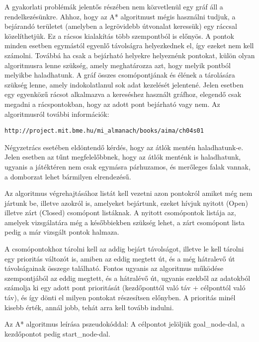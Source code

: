 A gyakorlati problémák jelentős részében nem közvetlenül egy gráf áll a rendelkezésünkre. Ahhoz, hogy az A* algoritmust mégis használni tudjuk, a bejárandó területet (amelyben a legrövidebb útvonalat keressük) egy ráccsal közelíthetjük. Ez a rácsos kialakítás több szempontból is előnyös. A pontok minden esetben egymástól egyenlő távolságra helyezkednek el, így ezeket nem kell számolni. Továbbá ha csak a bejárható helyekre helyeznénk pontokat, külön olyan algoritmusra lenne szükség, amely meghatározza azt, hogy melyik pontból melyikbe haladhatunk. A gráf összes csomópontjának és élének a tárolására szükség lenne, amely indokolatlanul sok adat kezelését jelentené. Jelen esetben egy egyenközű rácsot alkalmazva a kereséshez használt gráfhoz, elegendő csak megadni a rácspontokban, hogy az adott pont bejárható vagy nem. Az algoritmusról további információk:

\begin{verbatim}
http://project.mit.bme.hu/mi_almanach/books/aima/ch04s01
\end{verbatim}

Négyzetrács esetében eldöntendő kérdés, hogy az átlók mentén haladhatunk-e. Jelen esetben az tűnt megfelelőbbnek, hogy az átlók menténk is haladhatunk, ugyanis a játéktéren nem csak egymásra párhuzamos, és merőleges falak vannak, a domborzat lehet bármilyen elrendezésű.

Az algoritmus végrehajtásához listát kell vezetni azon pontokról amiket még nem jártunk be, illetve azokról is, amelyeket bejártunk, ezeket hívjuk nyitott (Open) illetve zárt (Closed) csomópont listáknak. A nyitott csomópontok listája az, amelyek vizsgálatára még a későbbiekben szükség lehet, a zárt csomópont lista pedig a már vizsgált pontok halmaza.


A csomópontokhoz tárolni kell az addig bejárt távolságot, illetve le kell tárolni egy prioritás változót is, amiben az eddig megtett út, és a még hátralevő út távolságainak összege található. Fontos ugyanis az algoritmus működése szempontjából az eddig megtett, és a hátralévő út, ugyanis ezekből az adatokból számolja ki egy adott pont prioritását (kezdőponttól való táv + célponttól való táv), és így dönti el milyen pontokat részesítsen előnyben. A prioritás minél kisebb érték, annál jobb, tehát arra kell tovább indulni.

Az A* algoritmus leírása pszeudokóddal:
A célpontot jelöljük goal\_node-dal, a kezdőpontot pedig start\_node-dal.

